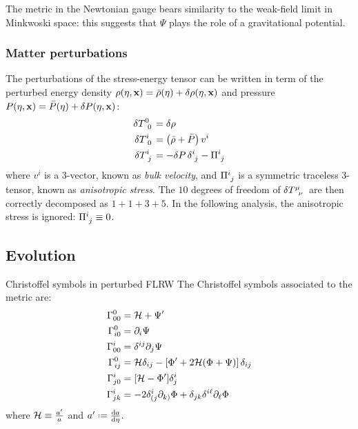 The metric in the Newtonian gauge bears similarity to the weak-field limit in Minkwoski space: this suggests that $ \Psi $ plays the role of a gravitational potential.

\subsubsection{Matter perturbations}

The perturbations of the stress-energy tensor can be written in term of the perturbed energy density $ \rho(\eta , \mathbf{x}) = \bar \rho(\eta) + \delta \rho(\eta , \mathbf{x}) $ and pressure $ P(\eta , \mathbf{x}) = \bar P(\eta) + \delta P(\eta , \mathbf{x}) $:
\begin{align}
  \tensor{\delta T}{^0_0} & = \delta \rho \\
  \tensor{\delta T}{^i_0} & = \left( \bar{\rho} + \bar{P} \right) v^i \\
  \tensor{\delta T}{^i_j} & = - \delta P \, \tensor{\delta}{^i_j} - \tensor{\Pi}{^i_j}
\end{align}
where $ v^i $ is a 3-vector, known as \emph{bulk velocity}, and $ \tensor{\Pi}{^i_j} $ is a symmetric traceless 3-tensor, known as \emph{anisotropic stress}. The $ 10 $ degrees of freedom of $ \delta \tensor{T}{^\mu_\nu} $ are then correctly decomposed as $ 1 + 1 + 3 + 5 $.
In the following analysis, the anisotropic stress is ignored: $ \tensor{\Pi}{^i_j} \equiv 0 $.

\subsection{Evolution}

\begin{lemma}{Christoffel symbols in perturbed FLRW}{}
  The Christoffel symbols associated to the metric  are:
  \begin{align}
    \Gamma^0_{00} & = \mathcal{H} + \Psi' \\
    \Gamma^0_{i0} & = \partial_i \Psi \\
    \Gamma^i_{00} & = \delta^{ij} \partial_j \Psi \\
    \Gamma^0_{ij} & = \mathcal{H} \delta_{ij} - \left[ \Phi' + 2\mathcal{H} (\Phi + \Psi) \right] \delta_{ij} \\
    \Gamma^i_{j0} & = [\mathcal{H} - \Phi'] \delta^i_j \\
    \Gamma^i_{jk} & = - 2 \delta^i_{(j} \partial_{k)} \Phi + \delta_{jk} \delta^{i\ell} \partial_\ell \Phi
  \end{align}
  where $ \mathcal{H} \equiv \frac{a'}{a} $ and $ a' \defeq \frac{\dd a}{\dd \eta} $.
\end{lemma}

